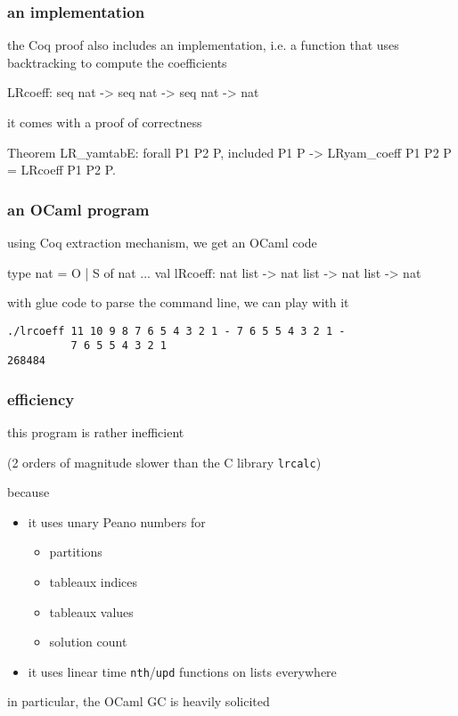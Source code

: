 \documentclass{beamer}
\let\emph\alert
\begin{document}
\begin{frame}[fragile]\frametitle{an implementation}
  the Coq proof also includes an \emph{implementation},
  i.e. a function that uses backtracking to compute the coefficients
\begin{coq}
LRcoeff: seq nat -> seq nat -> seq nat -> nat
\end{coq}

\bigskip
it comes with a proof of correctness
\begin{coq}
Theorem LR_yamtabE:
  forall P1 P2 P, included P1 P ->
  LRyam_coeff P1 P2 P = LRcoeff P1 P2 P.
\end{coq}
\end{frame}

\begin{frame}[fragile]\frametitle{an OCaml program}
using Coq extraction mechanism, we get an OCaml code
\begin{ocaml}
type nat = O | S of nat
...
val lRcoeff: nat list -> nat list -> nat list -> nat
\end{ocaml}

\bigskip
with glue code to parse the command line, we can play with it
\begin{verbatim}
./lrcoeff 11 10 9 8 7 6 5 4 3 2 1 - 7 6 5 5 4 3 2 1 -
          7 6 5 5 4 3 2 1
268484
\end{verbatim}
\end{frame}

\begin{frame}\frametitle{efficiency}
  this program is rather inefficient

  (2 orders of magnitude slower than the C library \texttt{lrcalc})

  \bigskip
  because
  \begin{itemize}
  \item it uses \emph{unary Peano numbers} for
    \begin{itemize}
    \item partitions
    \item tableaux indices
    \item tableaux values
    \item solution count
    \end{itemize}
  \item it uses \emph{linear time} \texttt{nth}/\texttt{upd} functions on lists
    everywhere
  \end{itemize}

  \bigskip
  in particular, the OCaml GC is heavily solicited
\end{frame}
\end{document}
